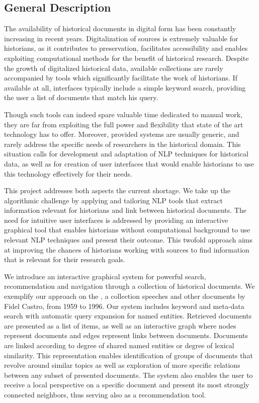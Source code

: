 

\subsection{General Description}
\label{sec:general_description}
The availability of historical documents in digital form has been constantly increasing in recent years. Digitalization of sources is extremely valuable for historians, as it contributes to preservation, facilitates accessibility and enables exploiting computational methods for the benefit of historical research. Despite the growth of digitalized historical data, available collections are rarely accompanied by tools which significantly facilitate the work of historians. If available at all,  interfaces typically include a simple keyword search, providing the user a list of documents that match his query. 

Though such tools can indeed spare valuable time dedicated to manual work, they are far from exploiting the full power and flexibility that state of the art technology has to offer. Moreover, provided systems are usually generic, and rarely address the specific needs of researchers in the historical domain. This situation calls for development and adaptation of NLP techniques for historical data, as well as for creation of user interfaces that would enable historians to use this technology effectively for their needs. 

This project addresses both aspects the current shortage. We take up the algorithmic challenge by applying and tailoring NLP tools that extract information relevant for historians and link between historical documents. The need for intuitive user interfaces is addressed by providing an interactive graphical tool that enables historians without computational background to use relevant NLP techniques and present their outcome. This twofold approach aims at improving the chances of historians working with sources to find information that is relevant for their research goals.

We introduce an interactive graphical system for powerful search, recommendation and navigation through a collection of historical documents. We exemplify our approach on the , a collection speeches and other documents by Fidel Castro, from 1959 to 1996. Our system includes keyword and meta-data search with automatic query expansion for named entities. Retrieved documents are presented as a list of items, as well as an interactive graph where nodes represent documents and edges represent links between documents. Documents are linked according to degree of shared named entities or degree of lexical similarity. This representation enables identification of groups of documents that revolve around similar topics as well as exploration of more specific relations between any subset of presented documents. The system also enables the user to receive a local perspective on a specific document and present its most strongly connected neighbors, thus serving also as a recommendation tool. 

